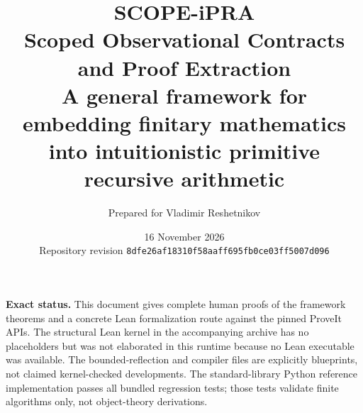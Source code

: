 \documentclass[11pt,oneside]{article}
\title{\textbf{SCOPE-iPRA}\\[0.4em]
\Large Scoped Observational Contracts and Proof Extraction\\
\large A general framework for embedding finitary mathematics into intuitionistic primitive recursive arithmetic}
\author{Prepared for Vladimir Reshetnikov}
\date{16 November 2026\\Repository revision \texttt{8dfe26af18310f58aaff695fb0ce03ff5007d096}}
\theoremstyle{definition}
\theoremstyle{remark}
\begin{document}
\maketitle
\thispagestyle{empty}
\vfill
\begin{center}
\begin{minipage}{0.88\textwidth}
\small
\textbf{Exact status.}  This document gives complete human proofs of the
framework theorems and a concrete Lean formalization route against the pinned
ProveIt APIs.  The structural Lean kernel in the accompanying archive has no
placeholders but was not elaborated in this runtime because no Lean executable
was available.  The bounded-reflection and compiler files are explicitly
blueprints, not claimed kernel-checked developments.  The standard-library
Python reference implementation passes all bundled regression tests; those
tests validate finite algorithms only, not object-theory derivations.
\end{minipage}
\end{center}
\vfill
\newpage

\begin{abstract}

\end{abstract}

\tableofcontents
\newpage



















\appendix



\end{document}
